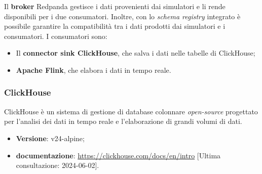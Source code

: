 Il \textbf{broker} Redpanda gestisce i dati provenienti dai simulatori e li rende disponibili per i due consumatori. Inoltre,
con lo \textit{schema registry} integrato è possibile garantire la compatibilità tra i dati prodotti dai simulatori e i consumatori.
I consumatori sono:
\begin{itemize}
	\item Il \textbf{connector sink ClickHouse}, che salva i dati nelle tabelle di ClickHouse;
	\item \textbf{Apache Flink}, che elabora i dati in tempo reale.
\end{itemize}

\subsubsection{ClickHouse}
ClickHouse è un sistema di gestione di database colonnare \textit{open-source} progettato per l'analisi dei dati in tempo reale e l'elaborazione di grandi volumi di dati.
\begin{itemize}
	\item \textbf{Versione}: v24-alpine;
	\item \textbf{documentazione}: \url{https://clickhouse.com/docs/en/intro} [Ultima consultazione: 2024-06-02].
\end{itemize}

